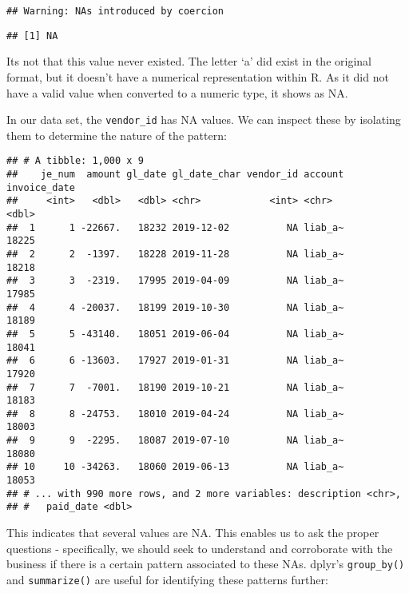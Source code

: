 \documentclass[
]{book}
\newenvironment{Shaded}{\begin{snugshade}}{\end{snugshade}}
\newcommand{\CommentTok}[1]{\textcolor[rgb]{0.56,0.35,0.01}{\textit{#1}}}
\newcommand{\KeywordTok}[1]{\textcolor[rgb]{0.13,0.29,0.53}{\textbf{#1}}}
\newcommand{\NormalTok}[1]{#1}
\newcommand{\OperatorTok}[1]{\textcolor[rgb]{0.81,0.36,0.00}{\textbf{#1}}}
\newcommand{\StringTok}[1]{\textcolor[rgb]{0.31,0.60,0.02}{#1}}
\begin{document}
\begin{verbatim}
## Warning: NAs introduced by coercion
\end{verbatim}

\begin{verbatim}
## [1] NA
\end{verbatim}

Its not that this value never existed. The letter `a' did exist in the original format, but it doesn't have a numerical representation within R. As it did not have a valid value when converted to a numeric type, it shows as NA.

In our data set, the \texttt{vendor\_id} has NA values. We can inspect these by isolating them to determine the nature of the pattern:

\begin{Shaded}
\end{Shaded}

\begin{verbatim}
## # A tibble: 1,000 x 9
##    je_num  amount gl_date gl_date_char vendor_id account invoice_date
##     <int>   <dbl>   <dbl> <chr>            <int> <chr>          <dbl>
##  1      1 -22667.   18232 2019-12-02          NA liab_a~        18225
##  2      2  -1397.   18228 2019-11-28          NA liab_a~        18218
##  3      3  -2319.   17995 2019-04-09          NA liab_a~        17985
##  4      4 -20037.   18199 2019-10-30          NA liab_a~        18189
##  5      5 -43140.   18051 2019-06-04          NA liab_a~        18041
##  6      6 -13603.   17927 2019-01-31          NA liab_a~        17920
##  7      7  -7001.   18190 2019-10-21          NA liab_a~        18183
##  8      8 -24753.   18010 2019-04-24          NA liab_a~        18003
##  9      9  -2295.   18087 2019-07-10          NA liab_a~        18080
## 10     10 -34263.   18060 2019-06-13          NA liab_a~        18053
## # ... with 990 more rows, and 2 more variables: description <chr>,
## #   paid_date <dbl>
\end{verbatim}

This indicates that several values are NA. This enables us to ask the proper questions - specifically, we should seek to understand and corroborate with the business if there is a certain pattern associated to these NAs. dplyr's \texttt{group\_by()} and \texttt{summarize()} are useful for identifying these patterns further:
\end{document}
